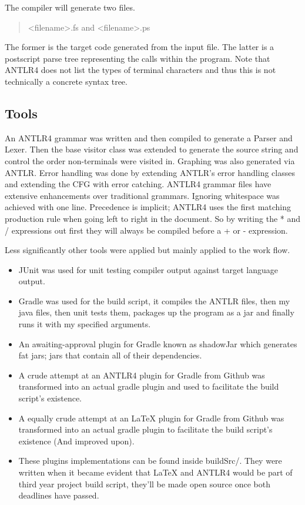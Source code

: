 \documentclass[a4paper,12pt]{article}
\begin{document}
\begin{landscape}
\begin{quotation}
\end{quotation}

The compiler will generate two files.
\begin{quotation}
<filename>.fs and <filename>.ps
\end{quotation}
The former is the target code generated from the input file. The latter is a postscript parse tree representing the calls within the program. Note that ANTLR4 does not list the types of terminal characters and thus this is not technically a concrete syntax tree.

\end{landscape}
\subsection{Tools}
An ANTLR4 grammar was written and then compiled to generate a Parser and Lexer. Then the base visitor class was extended to generate the source string and control the order non-terminals were visited in. Graphing was also generated via ANTLR. Error handling was done by extending ANTLR's error handling classes and extending the \gls{CFG} with error catching. ANTLR4 grammar files have extensive enhancements over traditional grammars. Ignoring whitespace was achieved with one
line. Precedence is implicit; ANTLR4 uses the first matching production rule when going left to right in the document. So by writing the * and / expressions out first they will always be compiled before a + or - expression.

Less significantly other tools were applied but mainly applied to the work flow.
\begin{itemize}
    \item JUnit was used for unit testing compiler output against target language output.
    \item Gradle was used for the build script, it compiles the ANTLR files, then my java files, then unit tests them, packages up the program as a jar and finally runs it with my specified arguments.
    \item An awaiting-approval plugin for Gradle known as shadowJar which generates fat jars; jars that contain all of their dependencies.
    \item A crude attempt at an ANTLR4 plugin for Gradle from Github was transformed into an actual gradle plugin and used to facilitate the build script's existence.
    \item A equally crude attempt at an LaTeX plugin for Gradle from Github was transformed into an actual gradle plugin to facilitate the build script's existence (And improved upon).
    \item These plugins implementations can be found inside buildSrc/. They were written when it became evident that LaTeX and ANTLR4 would be part of third year project build script, they'll be made open source once both deadlines have passed.
\end{itemize}
\end{document}
